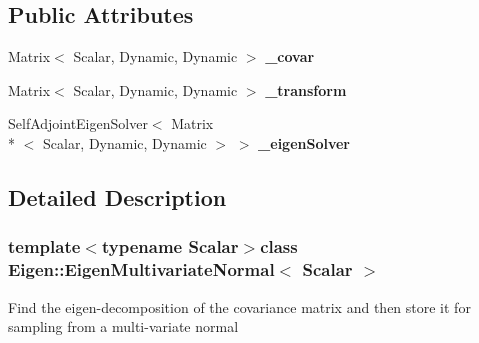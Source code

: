 \subsection*{Public Attributes}
\begin{DoxyCompactItemize}
\item 
\hypertarget{classEigen_1_1EigenMultivariateNormal_a0d7fcab2013f2073d1f9ceae83d2648e}{Matrix$<$ Scalar, Dynamic, Dynamic $>$ {\bfseries \-\_\-covar}}\label{classEigen_1_1EigenMultivariateNormal_a0d7fcab2013f2073d1f9ceae83d2648e}

\item 
\hypertarget{classEigen_1_1EigenMultivariateNormal_a7d2ecc245a87903ba31b390bbd983051}{Matrix$<$ Scalar, Dynamic, Dynamic $>$ {\bfseries \-\_\-transform}}\label{classEigen_1_1EigenMultivariateNormal_a7d2ecc245a87903ba31b390bbd983051}

\item 
\hypertarget{classEigen_1_1EigenMultivariateNormal_aceef5dd5ce5aee926fab9f051cd8904b}{Self\-Adjoint\-Eigen\-Solver$<$ Matrix\\*
$<$ Scalar, Dynamic, Dynamic $>$ $>$ {\bfseries \-\_\-eigen\-Solver}}\label{classEigen_1_1EigenMultivariateNormal_aceef5dd5ce5aee926fab9f051cd8904b}

\end{DoxyCompactItemize}


\subsection{Detailed Description}
\subsubsection*{template$<$typename Scalar$>$class Eigen\-::\-Eigen\-Multivariate\-Normal$<$ Scalar $>$}

Find the eigen-\/decomposition of the covariance matrix and then store it for sampling from a multi-\/variate normal 

